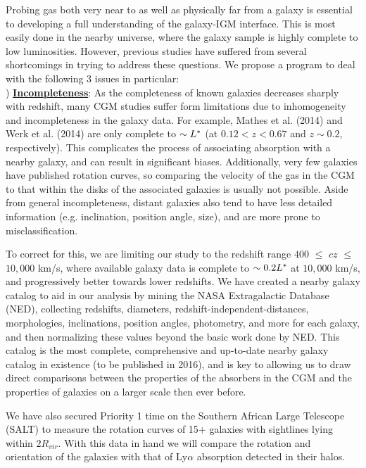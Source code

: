 \documentclass[12pt]{article}
\begin{document}

Probing gas both very near to as well as physically far from a galaxy is essential to developing a full understanding of the galaxy-IGM interface. This is most easily done in the nearby universe, where the galaxy sample is highly complete to low luminosities. However, previous studies have suffered from several shortcomings in trying to address these questions. We propose a program to deal with the following 3 issues in particular:\\

) \textbf{\underline{Incompleteness}}: As the completeness of known galaxies decreases sharply with redshift, many CGM studies suffer form limitations due to inhomogeneity and incompleteness in the galaxy data. For example, Mathes et al. (2014) and Werk et al. (2014) are only complete to $\sim L^{\**}$ (at $0.12 < z < 0.67$ and $z\sim0.2$, respectively). This complicates the process of associating absorption with a nearby galaxy, and can result in significant biases. Additionally, very few galaxies have published rotation curves, so comparing the velocity of the gas in the CGM to that within the disks of the associated galaxies is usually not possible. Aside from general incompleteness, distant galaxies also tend to have less detailed information (e.g. inclination, position angle, size), and are more prone to misclassification.

To correct for this, we are limiting our study to the redshift range $400$ $\leq$ $cz$ $\leq$ $10,000$ km/s, where available galaxy data is complete to $\sim0.2 L^{\**}$ at $10,000$ km/s, and progressively better towards lower redshifts. We have created a nearby galaxy catalog to aid in our analysis by mining the NASA Extragalactic Database (NED), collecting redshifts, diameters, redshift-independent-distances, morphologies, inclinations, position angles, photometry, and more for each galaxy, and then normalizing these values beyond the basic work done by NED. This catalog is the most complete, comprehensive and up-to-date nearby galaxy catalog in existence (to be published in 2016), and is key to allowing us to draw direct comparisons between the properties of the absorbers in the CGM and the properties of galaxies on a larger scale then ever before.

We have also secured Priority 1 time on the Southern African Large Telescope (SALT) to measure the rotation curves of 15+ galaxies with sightlines lying within $2R_{vir}$. With this data in hand we will compare the rotation and orientation of the galaxies with that of Ly$\alpha$ absorption detected in their halos. \\
\end{document}
